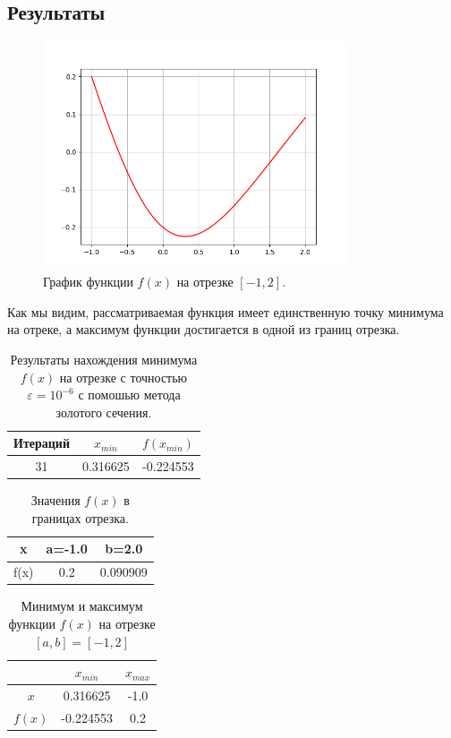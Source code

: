 \documentclass[12pt]{article}%
\begin{document}
\subsection{Результаты}
\begin{figure}[!h]
    \centering
    \includegraphics[width=0.8\textwidth]{task2_plot.png}
    \caption{График функции $f(x)$ на отрезке $[-1, 2]$.}
\end{figure}

Как мы видим, рассматриваемая функция имеет единственную точку минимума на отреке, а максимум функции достигается в одной из границ отрезка.

\begin{table}[!h]
\centering
\begin{tabular}{|c|c|c|}
    \hline Итераций & $x_{min}$ & $f(x_{min})$ \\
    \hline 31 & 0.316625 & -0.224553 \\
    \hline
\end{tabular}
    \caption{Результаты нахождения минимума $f(x)$ на отрезке с точностью $\varepsilon=10^{-6}$ с помошью метода золотого сечения.}
\end{table}

\begin{table}[!h]
    \centering
    \begin{tabular}{|c|c|c|}
    \hline x & a=-1.0 & b=2.0  \\
    \hline f(x) & 0.2 & 0.090909 \\
    \hline
    \end{tabular}
    \caption{Значения $f(x)$ в границах отрезка.}
\end{table}

\newpage
\begin{table}[h]
    \centering
    \begin{tabular}{|c|c|c|}
\hline & $x_{min}$ & $x_{max}$  \\
\hline $x$ & 0.316625 & -1.0 \\
\hline $f(x)$ & -0.224553 & 0.2 \\
\hline
    \end{tabular}
    \caption{Минимум и максимум функции $f(x)$ на отрезке $[a, b]=[-1, 2]$}
    \label{tab:my_label}
\end{table}
\end{document}

